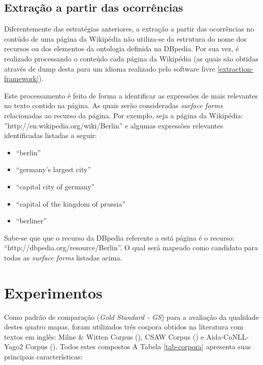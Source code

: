 \documentclass[10pt,a4paper]{llncs}
\begin{document}
{\subsection{Extração a partir das ocorrências} \label{extracao-ocorrencias}
\indent\indent Diferentemente das estratégias anteriores, a extração a partir das ocorrências no contúdo de uma página da Wikipédia não utiliza-se da estrutura do nome dos recursos ou dos elementos da ontologia definida na DBpedia. Por sua vez, é realizado processando o conteúdo cada página da Wikipédia (as quais são obtidas através de dump desta para um idioma realizado pelo software livre \ref{extraction-framework}).

Este processamento é feito de forma a identificar as expressões de mais relevantes no texto contido na página. As quais serão consideradas \textit{surface forms} relacionadas ao recurso da página. Por exemplo, seja a página da Wikipédia: ''http://en.wikipedia.org/wiki/Berlin'' e algumas expressões relevantes identificadas listadas a seguir:
\begin{itemize}
 \item ``berlin''
 \item ``germany's largest city''
 \item ``capital city of germany''
 \item ``capital of the kingdom of prussia''
 \item ``berliner''
\end{itemize}

Sabe-se que que o recurso da DBpedia referente a está página é o recurso: ``http://dbpedia.org/resource/Berlin''. O qual será mapeado como candidato para todas as \textit{surface forms} listadas acima.


\section{Experimentos} \label{experimentos}
\indent\indent Como padrão de comparação (\textit{Gold Standard - GS}) para a avaliação da qualidade destes quatro mapas, foram utilizados três cospora obtidos na literatura com textos em inglês: Milne \& Witten Corpus (\cite{citep-MW-vide-apresentacao-spotters}), CSAW Corpus (\cite{citep-CSAW-vide-apresentacao-spotters}) e Aida-CoNLL-Yago2 Corpus (\cite{citep-MW-vide-apresentacao-spotters}). Todos estes compostos A Tabela \ref{tab-corpora} apresenta suas principais características:

}
\end{document}
